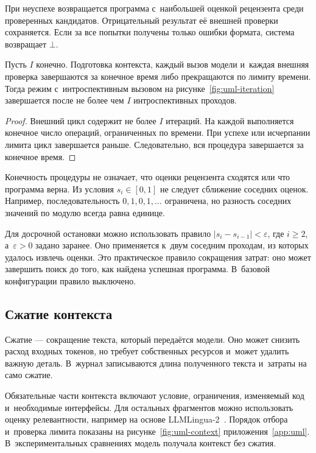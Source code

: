 При неуспехе возвращается программа с~наибольшей оценкой рецензента среди проверенных кандидатов. Отрицательный результат её внешней проверки сохраняется. Если за все попытки получены только ошибки формата, система возвращает $\bot$.

\begin{proposition}\label{prop:termination}
Пусть $I$ конечно. Подготовка контекста, каждый вызов модели и~каждая внешняя проверка завершаются за конечное время либо прекращаются по лимиту времени. Тогда режим с~интроспективным вызовом на рисунке~\ref{fig:uml-iteration} завершается после не более чем $I$ интроспективных проходов.
\end{proposition}
\begin{proof}
Внешний цикл содержит не более $I$ итераций. На каждой выполняется конечное число операций, ограниченных по времени. При успехе или исчерпании лимита цикл завершается раньше. Следовательно, вся процедура завершается за конечное время.
\end{proof}

Конечность процедуры не означает, что оценки рецензента сходятся или что программа верна. Из условия $s_i\in[0,1]$ не следует сближение соседних оценок. Например, последовательность $0,1,0,1,\ldots$ ограничена, но разность соседних значений по модулю всегда равна единице.

Для досрочной остановки можно использовать правило $|s_i-s_{i-1}|<\varepsilon$, где $i\ge2$, а~$\varepsilon>0$ задано заранее. Оно применяется к~двум соседним проходам, из которых удалось извлечь оценки. Это практическое правило сокращения затрат: оно может завершить поиск до того, как найдена успешная программа. В~базовой конфигурации правило выключено.

\subsection{Сжатие контекста}
Сжатие --- сокращение текста, который передаётся модели. Оно может снизить расход входных токенов, но требует собственных ресурсов и~может удалить важную деталь. В~журнал записываются длина полученного текста и~затраты на само сжатие.

Обязательные части контекста включают условие, ограничения, изменяемый код и~необходимые интерфейсы. Для остальных фрагментов можно использовать оценку релевантности, например на основе LLMLingua-2~\cite{pan2024llmlingua2}. Порядок отбора и~проверка лимита показаны на рисунке~\ref{fig:uml-context} приложения~\ref{app:uml}. В~экспериментальных сравнениях модель получала контекст без сжатия.
\FloatBarrier
